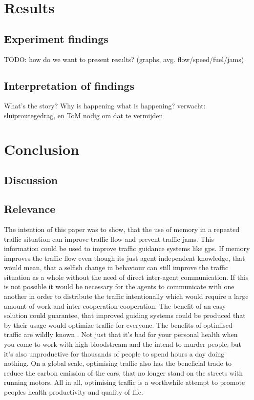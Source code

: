 \documentclass[a4paper,hidelinks]{article}
\begin{document}
\section{Results}
\subsection{Experiment findings}
TODO: how do we want to present results? (graphs, avg. flow/speed/fuel/jams)

\subsection{Interpretation of findings}
What's the story? Why is happening what is happening? verwacht: sluiproutegedrag, en ToM nodig om dat te vermijden

\section{Conclusion}
\subsection{Discussion}
\subsection{Relevance}
The intention of this paper was to show, that the use of memory in a repeated traffic situation can improve traffic flow and prevent traffic jams. This information could be used to improve traffic guidance systems like gps. If memory improves the traffic flow even though its just agent independent knowledge, that would mean, that a selfish change in behaviour can still improve the traffic situation as a whole without the need of direct inter-agent communication. If this is not possible it would be necessary for the agents to communicate with one another in order to distribute the traffic intentionally which would require a large amount of work and inter cooperation-cooperation. 
The benefit of an easy solution could guarantee, that improved guiding systems could be produced that by their usage would optimize traffic for everyone. The benefits of optimised traffic are wildly known \cite{france2003multiagent}. Not just that it's bad for your personal health when you come to work with high bloodstream and the intend to murder people, but it's also unproductive for thousands of people to spend hours a day doing nothing. On a global scale, optimising traffic also has the beneficial trade to reduce the carbon emission of the cars, that no longer stand on the streets with running motors. All in all, optimising traffic is a worthwhile attempt to promote peoples health productivity and quality of life. 




\end{document}
